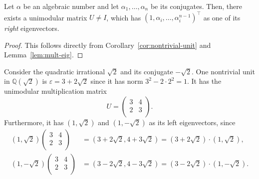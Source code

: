 \begin{theorem}
  \label{thm:unimodular-algebraic}
  Let $α$ be an algebraic number and let $α_1, …, α_n$ be its conjugates.
  Then, there exists a unimodular matrix $U ≠ I$,
  which has $(1, α_i, …, α_i^{n-1})^⊤$ as one of its \emph{right} eigenvectors.
\end{theorem}

\begin{proof}
  This follows directly from Corollary~\ref{cor:nontrivial-unit} and Lemma~\ref{lem:mult-eig}.
\end{proof}

\begin{example}
  \label{ex:sqrt2-unit}
  Consider the quadratic irrational $\sqrt{2}$
  and its conjugate $-\sqrt{2}$.
  One nontrivial unit in $ℚ(\sqrt{2})$ is $ε = 3 + 2\sqrt{2}$
  since it has norm $3^2 - 2 · 2^2 = 1$.
  It has the unimodular multiplication matrix
  \[
    U = \begin{pmatrix}
      3 & 4 \\
      2 & 3 \\
    \end{pmatrix}.
  \]
  Furthermore, it has $(1, \sqrt{2})$ and $(1, -\sqrt{2})$ as its left eigenvectors,
  since
  \begin{align*}
    (1, \sqrt{2})
    \begin{pmatrix}
      3 & 4 \\
      2 & 3 \\
    \end{pmatrix}
    & = (3 + 2\sqrt{2}, 4 + 3\sqrt{2})
    = (3 + 2\sqrt{2}) · (1, \sqrt{2}), \\
    (1, -\sqrt{2})
    \begin{pmatrix}
      3 & 4 \\
      2 & 3 \\
    \end{pmatrix}
    & = (3 - 2\sqrt{2}, 4 - 3\sqrt{2})
    = (3 - 2\sqrt{2}) · (1, -\sqrt{2}).
  \end{align*}
\end{example}
